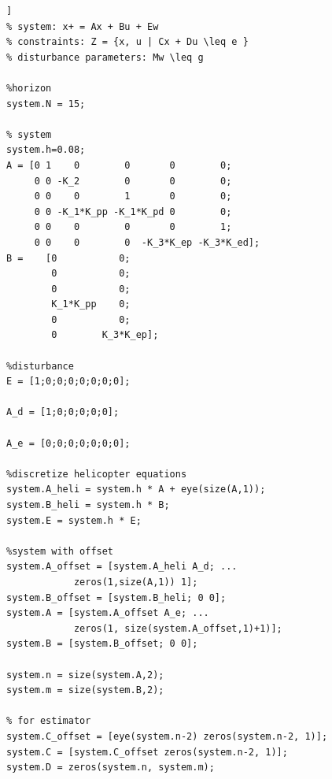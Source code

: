 \begin{lstlisting}[caption={data.m}]]
% system: x+ = Ax + Bu + Ew
% constraints: Z = {x, u | Cx + Du \leq e }
% disturbance parameters: Mw \leq g

%horizon
system.N = 15;

% system 
system.h=0.08;
A = [0 1    0        0       0        0;
     0 0 -K_2        0       0        0;
     0 0    0        1       0        0;
     0 0 -K_1*K_pp -K_1*K_pd 0        0;
     0 0    0        0       0        1;
     0 0    0        0  -K_3*K_ep -K_3*K_ed];
B =    [0           0;
        0           0;
        0           0;
        K_1*K_pp    0;
        0           0;
        0        K_3*K_ep];

%disturbance
E = [1;0;0;0;0;0;0;0];    

A_d = [1;0;0;0;0;0];

A_e = [0;0;0;0;0;0;0];

%discretize helicopter equations   
system.A_heli = system.h * A + eye(size(A,1));
system.B_heli = system.h * B;    
system.E = system.h * E;

%system with offset
system.A_offset = [system.A_heli A_d; ...
            zeros(1,size(A,1)) 1];
system.B_offset = [system.B_heli; 0 0];    
system.A = [system.A_offset A_e; ...
            zeros(1, size(system.A_offset,1)+1)];
system.B = [system.B_offset; 0 0];

system.n = size(system.A,2);
system.m = size(system.B,2);

% for estimator
system.C_offset = [eye(system.n-2) zeros(system.n-2, 1)];
system.C = [system.C_offset zeros(system.n-2, 1)];
system.D = zeros(system.n, system.m);



\end{lstlisting}
